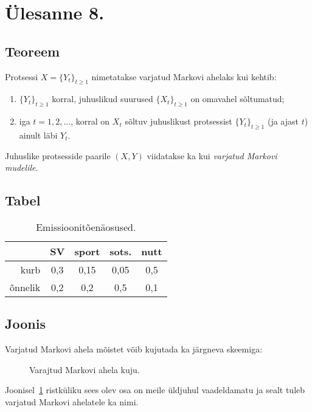 \section{Ülesanne 8.}

\subsection{Teoreem}

\begin{definition}%
	Protsessi $X = \{Y_t\}_{t\geq1}$ nimetatakse varjatud Markovi ahelaks kui kehtib:

	\begin{enumerate}
		\item $\{Y_t\}_{t\geq1}$ korral, juhuslikud suurused $\{X_t\}_{t\geq1}$ on omavahel sõltumatud;
		\item iga $t = 1,2,\dots$, korral on $X_t$ sõltuv juhuslikust protsessist $\{Y_t\}_{t\geq1}$ (ja ajast $t$) ainult läbi $Y_t$.
	\end{enumerate}

	Juhuslike protsesside paarile $(X, Y)$ viidatakse ka kui \textit{varjatud Markovi mudelile}.
\end{definition}

\subsection{Tabel}

\begin{table}[h]
	\centering
	\begin{tabular}{ r | *{4}{c} }	
						& SV 	& sport & sots. & nutt\\
		\hline
			 kurb & 0,3 & 0,15	 & 0,05 & 0,5 \\
		õnnelik & 0,2	& 0,2   & 0,5	& 0,1 \\
	\end{tabular}

	\caption{Emissioonitõenäosused.}
	\label{fig:HMM.ex.emission}
\end{table}

\subsection{Joonis}

Varjatud Markovi ahela mõistet võib kujutada ka järgneva skeemiga:

\begin{figure}[h]
	\centering
	
	\caption{Varajtud Markovi ahela kuju.}
	\label{fig:HMM}
\end{figure}

Joonisel~\ref{fig:HMM} ristküliku sees olev osa on meile üldjuhul vaadeldamatu ja sealt tuleb varjatud Markovi ahelatele ka nimi.
